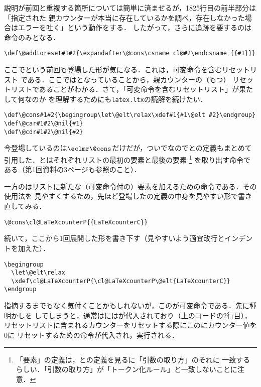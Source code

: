 \documentclass[autodetect-engine,dvipdfmx]{jsarticle}
\begin{document}
説明が前回と重複する箇所については簡単に済ませるが，1825行目の前半部分は「指定された
親カウンターが本当に存在しているかを調べ，存在しなかった場合はエラーを吐く」という動作をする．
したがって，さらに追跡を要するのは命令のみとなる．

\begin{lstlisting}[firstnumber=1842]
\def\@addtoreset#1#2{\expandafter\@cons\csname cl@#2\endcsname {{#1}}}
\end{lstlisting}

ここでという前回も登場した形が気になる．これは，可変命令を含むリセットリスト
である．ここではとなっていることから，親カウンターの（もつ）
リセットリストであることがわかる．さて，「可変命令を含むリセットリスト」が果たして何なのか
を理解するためにも\texttt{latex.ltx}の読解を続けたい．
\begin{lstlisting}[firstnumber=579]
\def\@cons#1#2{\begingroup\let\@elt\relax\xdef#1{#1\@elt #2}\endgroup}
\def\@car#1#2\@nil{#1}
\def\@cdr#1#2\@nil{#2}
\end{lstlisting}

今登場しているのは$\cmd{@cons}$だけだが，ついでなのでとの定義もまとめて
引用した．とはそれぞれリストの最初の要素と最後の要素
\footnote{「要素」の定義は，との定義を見るに「引数の取り方」のそれに
一致するらしい．「引数の取り方」が「トークン化ルール」と一致しないことに注意．}
を取り出す命令である（第1回資料の3ページも参照のこと）．

一方のはリストに新たな（可変命令付の）要素を加えるための命令である．その使用法を
見やすくするため，先ほど登場したの定義の中身を見やすい形で書き直してみる．
\texsource
\begin{lstlisting}
\@cons\cl@LaTeXcounterP{{LaTeXcounterC}}
\end{lstlisting}
続いて，ここから1回展開した形を書き下す（見やすいよう適宜改行とインデントを加えた）．
\begin{lstlisting}
\begingroup
  \let\@elt\relax
  \xdef\cl@LaTeXcounterP{\cl@LaTeXcounterP\@elt{LaTeXcounterC}}
\endgroup
\end{lstlisting}

指摘するまでもなく気付くことかもしれないが，このが可変命令である．先に種明かしを
してしまうと，通常はにはが代入されており（上のコードの2行目），
リセットリストに含まれるカウンターをリセットする際にこのにカウンター値を0に
リセットするための命令が代入され，実行される．
\end{document}
